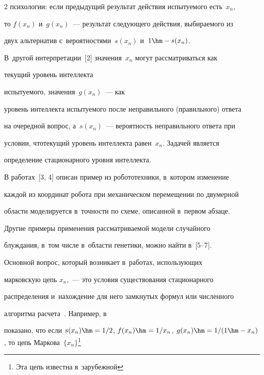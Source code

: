 \begin{multicols}{2}
психологии: если предыдущий результат действия испытуемого есть~$x_n$, 


то $f(x_n)$ и~$g(x_n)$~--- результат сле\-ду\-юще\-го действия, вы\-би\-ра\-емо\-го из 


двух альтернатив с~вероятностями~$s(x_n)$ и~$1\hm-s(x_n)$.


  


  В~другой интерпретации~[2] значения~$x_n$ могут рас\-смат\-ри\-вать\-ся как 


текущий уровень интеллекта\linebreak


 испытуемого, значения~$g(x_n)$~--- как 


уровень интеллекта испытуемого после неправильного (правильного) ответа 


на очередной вопрос, а~$s(x_n)$~--- вероятность неправильного ответа при 


условии, что\linebreak текущий уровень интеллекта равен~$x_n$. Задачей является 


определение стационарного уровня интеллекта.


  


  В работах~[3, 4] описан пример из робототехники, в~котором изменение 


каждой из координат робота при механическом перемещении по двумерной 


области моделируется в~точ\-ности по схеме, описанной в~первом абзаце. 


Другие примеры применения рас\-смат\-ри\-ва\-емой модели случайного 


блуж\-да\-ния, в~том чис\-ле в~об\-ласти генетики, мож\-но найти в~[5--7].


  


  Основной вопрос, который возникает в~работах, ис\-поль\-зу\-ющих 


марковскую цепь $x_n$,~--- это условия существования стационарного 


распределения и~на\-хож\-де\-ние для него замкнутых формул или чис\-лен\-но\-го 


алгоритма расчета~\cite{3-kr, 4-kr, 8-kr, 9-kr, 10-kr}. Например, в~\cite{8-kr} 


показано, что если $s(x_n)\hm=1/2$, $f(x_n)\hm=1/x_n$, $g(x_n)\hm=1/(1\hm-


x_n)$, то цепь Маркова~$\{x_n\}$\footnote[3]{Эта цепь известна в~зарубежной 


}
\end{multicols}
